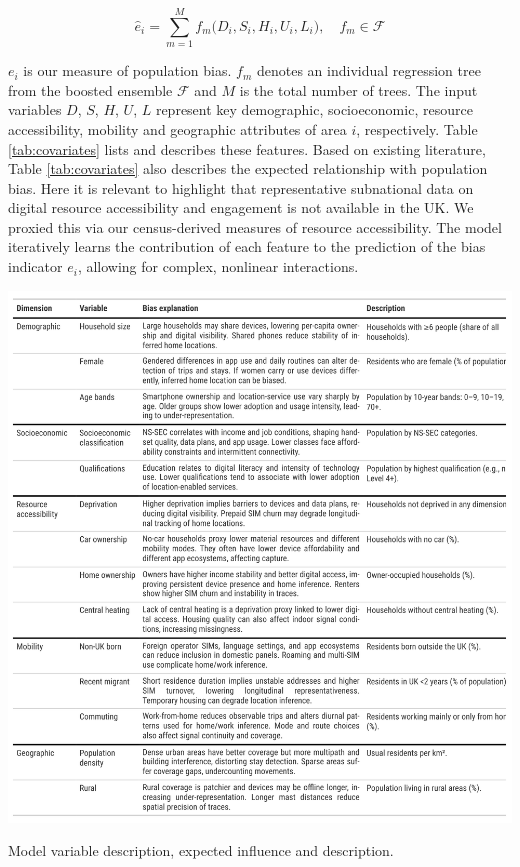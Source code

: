 \documentclass{article}
\begin{document}
\begin{equation} \label{eq:xgb-model}
\widehat{e}_i 
= \sum_{m=1}^M f_m\bigl(D_i, S_i, H_i, U_i, L_i\bigr),
\quad f_m \in \mathcal{F}
\end{equation}

\(e_i\) is our measure of population bias. \(f_m\) denotes an individual
regression tree from the boosted ensemble \(\mathcal{F}\) and \(M\) is the
total number of trees. The input variables \(D\), \(S\), \(H\), \(U\), \(L\)
represent key demographic, socioeconomic, resource accessibility, mobility and geographic attributes of area \(i\), respectively. Table
\ref{tab:covariates} lists and describes these features. Based on existing literature, Table
\ref{tab:covariates} also describes the expected relationship with population bias. Here it is relevant to highlight that representative subnational data on digital resource accessibility and engagement is not available in the UK. We proxied this via our census-derived measures of resource accessibility. The model iteratively
learns the contribution of each feature to the prediction of the bias
indicator \(e_i\), allowing for complex, nonlinear interactions.

\begin{table}[h]
\centering
\includegraphics[width=1\linewidth]{figures/01_table-variable-dictionary_explain.png}
\caption{Model variable description, expected influence and description.}
\label{tab:covariates}
\end{table}
\end{document}
